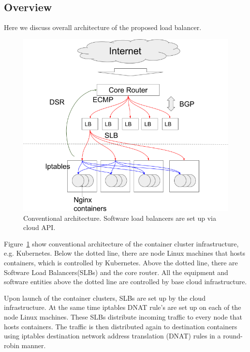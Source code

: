 \subsection{Overview}\label{Network}
Here we discuss overall architecture of the proposed load balancer.
\begin{figure}
\includegraphics[width=\columnwidth]{Figs/google_lb.png}
\caption{Conventional architecture. Software load balancers are set up via cloud API. }
\label{fig:google_lb}
\end{figure}
Figure~\ref{fig:google_lb} show conventional architecture of the container cluster infrastructure, e.g. Kubernetes.
Below the dotted line, there are node Linux machines that hosts containers, which is controlled by Kubernetes.
Above the dotted line, there are Software Load Balancers(SLBs) and the core router.
All the equipment and software entities above the dotted line are controlled by base cloud infrastructure.

Upon launch of the container clusters, SLBs are set up by the cloud infrastructure.
At the same time iptables DNAT rule's are set up on each of the node Linux machines.
These SLBs distribute incoming traffic to every node that hosts containers.
The traffic is then distributed again to destination containers using iptables destination 
network address translation (DNAT)\cite{MartinA.Brown2017,Marmol2015} rules in a round-robin manner. 

